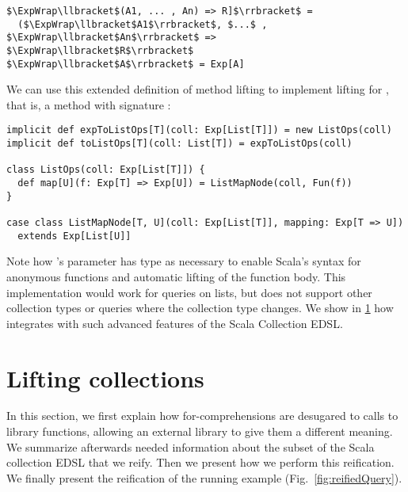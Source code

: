\begin{lstlisting}
$\ExpWrap\llbracket$(A1, ... , An) => R]$\rrbracket$ =
  ($\ExpWrap\llbracket$A1$\rrbracket$, $...$ , $\ExpWrap\llbracket$An$\rrbracket$ => $\ExpWrap\llbracket$R$\rrbracket$
$\ExpWrap\llbracket$A$\rrbracket$ = Exp[A]
\end{lstlisting}

We can use this extended definition of method lifting to  implement  lifting for , that is, a method with signature :

\begin{lstlisting}
implicit def expToListOps[T](coll: Exp[List[T]]) = new ListOps(coll)
implicit def toListOps[T](coll: List[T]) = expToListOps(coll)

class ListOps(coll: Exp[List[T]]) {
  def map[U](f: Exp[T] => Exp[U]) = ListMapNode(coll, Fun(f))
}

case class ListMapNode[T, U](coll: Exp[List[T]], mapping: Exp[T => U])
  extends Exp[List[U]]
\end{lstlisting}

Note how 's parameter  has type  as necessary to enable Scala's syntax for anonymous functions and automatic lifting of the function body. This implementation would work for queries on lists, but does not support other collection types or queries where the collection type changes. We show in \cref{subsec:collections} how {\LoS} integrates with such advanced features of the Scala Collection EDSL\@.


\section{Lifting collections}
\label{subsec:collections}
In this section, we first explain how for-comprehensions are desugared to calls to library functions, allowing an external library to give them a different meaning. We summarize afterwards needed information about the subset of the Scala collection EDSL that we reify. Then we present how we perform this reification.
We finally present the reification of the running example (Fig.~\ref{fig:reifiedQuery}).

